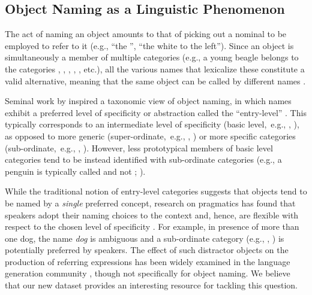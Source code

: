\subsection{Object Naming as a Linguistic Phenomenon}
\label{subsec:rosch}

The act of naming an object amounts to that of picking out a nominal to be employed to refer to it (e.g., ``the '', ``the white  to the left'').
Since an object is simultaneously a member of multiple categories (e.g., a young beagle belongs to the categories , , , , , etc.), all the various names that lexicalize these constitute a valid alternative, meaning that the same object can be called by different names \cite{brown1958shall,murphy2004big}.

Seminal work by  inspired a taxonomic view of object naming, in which names exhibit a preferred level of specificity or abstraction called the ``entry-level'' \cite{jolicoeur1984pictures}. 
This typically corresponds to an intermediate level of specificity (basic level,\ e.g., , ), as opposed to more generic (super-ordinate,\ e.g., , ) or more specific categories (sub-ordinate,\ e.g., , ).
However, less prototypical members of basic level categories tend to be instead identified with sub-ordinate categories (e.g., a penguin is typically called  and not ; ). 

While the traditional notion of entry-level categories suggests that objects tend to be named by a \textit{single} preferred concept, research on pragmatics has found that speakers adopt their naming choices to the context and, hence, are flexible with respect to the chosen level of specificity \cite{olson1970language,rohde2012communicating,graf2016animal}.
For example, in presence of more than one dog, the name \textsl{dog} is ambiguous and a sub-ordinate category (e.g., , ) is potentially preferred by speakers. The effect of such distractor objects on the production of referring expressions has been widely examined in the language generation community \cite{krahmer:2012}, though not specifically for object naming. We believe that our new dataset provides an interesting resource for tackling this question.

